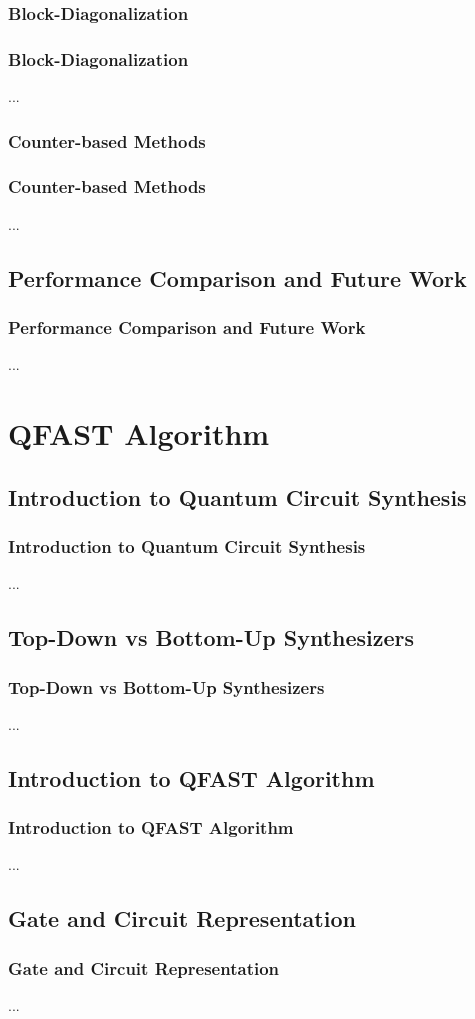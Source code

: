 \documentclass[aspectratio=1610]{beamer}
\begin{document}
\subsubsection{Block-Diagonalization}
\begin{frame}
\frametitle{Block-Diagonalization}
...
\end{frame}

\subsubsection{Counter-based Methods}
\begin{frame}
\frametitle{Counter-based Methods}
...
\end{frame}

\subsection{Performance Comparison and Future Work}
\begin{frame}
\frametitle{Performance Comparison and Future Work}
...
\end{frame}

\section{QFAST Algorithm}
\subsection{Introduction to Quantum Circuit Synthesis}
\begin{frame}
\frametitle{Introduction to Quantum Circuit Synthesis}
...
\end{frame}

\subsection{Top-Down vs Bottom-Up Synthesizers}
\begin{frame}
\frametitle{Top-Down vs Bottom-Up Synthesizers}
...
\end{frame}

\subsection{Introduction to QFAST Algorithm}
\begin{frame}
\frametitle{Introduction to QFAST Algorithm}
...
\end{frame}

\subsection{Gate and Circuit Representation}
\begin{frame}
\frametitle{Gate and Circuit Representation}
...
\end{frame}
\end{document}
